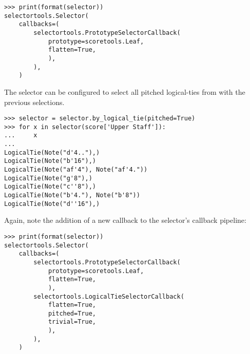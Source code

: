 \begin{comment}
<abjad>
print(format(selector))
</abjad>
\end{comment}

\begin{abjadbookoutput}
\begin{singlespacing}
\vspace{-0.5\baselineskip}
\begin{verbatim}
>>> print(format(selector))
selectortools.Selector(
    callbacks=(
        selectortools.PrototypeSelectorCallback(
            prototype=scoretools.Leaf,
            flatten=True,
            ),
        ),
    )
\end{verbatim}
\end{singlespacing}
\end{abjadbookoutput}

\noindent The selector can be configured to select all pitched logical-ties
from with the previous selections.

\begin{comment}
<abjad>
selector = selector.by_logical_tie(pitched=True)
for x in selector(score['Upper Staff']):
    x

</abjad>
\end{comment}

\begin{abjadbookoutput}
\begin{singlespacing}
\vspace{-0.5\baselineskip}
\begin{verbatim}
>>> selector = selector.by_logical_tie(pitched=True)
>>> for x in selector(score['Upper Staff']):
...     x
...
LogicalTie(Note("d'4.."),)
LogicalTie(Note("b'16"),)
LogicalTie(Note("af'4"), Note("af'4."))
LogicalTie(Note("g'8"),)
LogicalTie(Note("c''8"),)
LogicalTie(Note("b'4."), Note("b'8"))
LogicalTie(Note("d''16"),)
\end{verbatim}
\end{singlespacing}
\end{abjadbookoutput}

\noindent Again, note the addition of a new callback to the selector's callback
pipeline:

\begin{comment}
<abjad>
print(format(selector))
</abjad>
\end{comment}

\begin{abjadbookoutput}
\begin{singlespacing}
\vspace{-0.5\baselineskip}
\begin{verbatim}
>>> print(format(selector))
selectortools.Selector(
    callbacks=(
        selectortools.PrototypeSelectorCallback(
            prototype=scoretools.Leaf,
            flatten=True,
            ),
        selectortools.LogicalTieSelectorCallback(
            flatten=True,
            pitched=True,
            trivial=True,
            ),
        ),
    )
\end{verbatim}
\end{singlespacing}
\end{abjadbookoutput}


